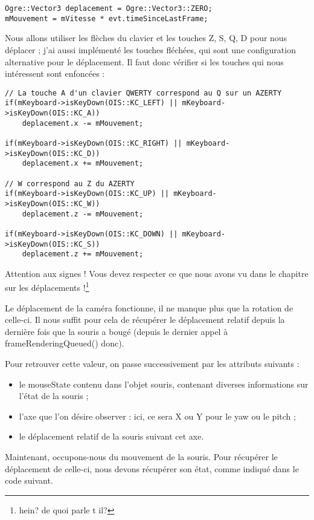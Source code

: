 \begin{lstlisting}[caption={}]
Ogre::Vector3 deplacement = Ogre::Vector3::ZERO;
mMouvement = mVitesse * evt.timeSinceLastFrame;
\end{lstlisting}

Nous allons utiliser les fl\`eches du clavier et les touches Z, S, Q, D pour nous d\'eplacer ; j'ai aussi impl\'ement\'e les touches fl\'ech\'ees, qui sont une configuration alternative pour le d\'eplacement. Il faut donc v\'erifier si les touches qui nous int\'eressent sont enfonc\'ees :


\begin{lstlisting}[caption={}]
// La touche A d'un clavier QWERTY correspond au Q sur un AZERTY
if(mKeyboard->isKeyDown(OIS::KC_LEFT) || mKeyboard->isKeyDown(OIS::KC_A)) 
    deplacement.x -= mMouvement;

if(mKeyboard->isKeyDown(OIS::KC_RIGHT) || mKeyboard->isKeyDown(OIS::KC_D))
    deplacement.x += mMouvement;
    
// W correspond au Z du AZERTY
if(mKeyboard->isKeyDown(OIS::KC_UP) || mKeyboard->isKeyDown(OIS::KC_W)) 
    deplacement.z -= mMouvement;

if(mKeyboard->isKeyDown(OIS::KC_DOWN) || mKeyboard->isKeyDown(OIS::KC_S))
    deplacement.z += mMouvement;
\end{lstlisting}

Attention aux signes ! Vous devez respecter ce que nous avons vu dans le chapitre sur les d\'eplacements !\footnote{hein? de quoi parle t il?}

Le d\'eplacement de la cam\'era fonctionne, il ne manque plus que la rotation de celle-ci. Il nous suffit pour cela de r\'ecup\'erer le d\'eplacement relatif depuis la derni\`ere fois que la souris a boug\'e (depuis le dernier appel \`a frameRenderingQueued() donc).

Pour retrouver cette valeur, on passe successivement par les attributs suivants :
\begin{itemize}
\item le mouseState contenu dans l'objet souris, contenant diverses informations sur l'\'etat de la souris ;
\item l'axe que l'on d\'esire observer : ici, ce sera X ou Y pour le yaw ou le pitch ;
\item le d\'eplacement relatif de la souris suivant cet axe.
\end{itemize}

Maintenant, occupons-nous du mouvement de la souris. Pour r\'ecup\'erer le d\'eplacement de celle-ci, nous devons r\'ecup\'erer son \'etat, comme indiqu\'e dans le code suivant.


